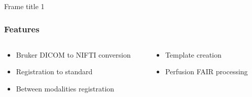 \documentclass{beamer}
\newcommand{\myciting}[1]{{\footnotesize{\tt{\textcolor{magenta}{[#1]}}}}}
\begin{document}
\begin{frame}{Frame title 1}
\frametitle{Features}

  \begin{center} 
    \begin{columns}

      \begin{column}{0.5\textwidth}
 \begin{itemize}
 \item Bruker DICOM to NIFTI conversion
 \vspace*{0.1\linewidth}
 \item Registration to standard
 \vspace*{0.1\linewidth}
 \item Between modalities registration 
 \end{itemize}
      \end{column}

      \begin{column}{0.5\textwidth}
 \begin{itemize}
 \item Template creation
 \vspace*{0.2\linewidth}
 \item Perfusion FAIR processing
 \end{itemize}
      \end{column}

     \end{columns}
   \end{center}


\end{frame}
\end{document}
